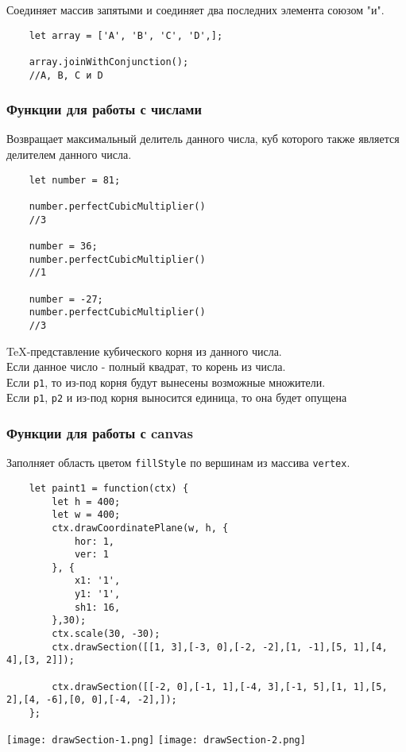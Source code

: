 Соединяет массив запятыми и соединяет два последних элемента союзом "и".

\begin{lstlisting}
    let array = ['A', 'B', 'C', 'D',];

    array.joinWithConjunction();
    //A, B, C и D
\end{lstlisting}

\subsubsection{Функции для работы с числами}
Возвращает максимальный делитель данного числа, куб которого также является делителем данного числа.

\begin{lstlisting}
    let number = 81;

    number.perfectCubicMultiplier()
    //3

    number = 36;
    number.perfectCubicMultiplier()
    //1

    number = -27;
    number.perfectCubicMultiplier()
    //3
\end{lstlisting}

TeX-представление кубического корня из данного числа.\\
Если данное число - полный квадрат, то корень из числа.\\
Если \texttt{p1}, то из-под корня будут вынесены возможные множители.\\
Если \texttt{p1}, \texttt{p2} и из-под корня выносится единица, то она будет опущена\\

\subsubsection{Функции для работы с canvas}
Заполняет область цветом \texttt{fillStyle} по вершинам из массива \texttt{vertex}.

\begin{lstlisting}
    let paint1 = function(ctx) {
        let h = 400;
        let w = 400;
        ctx.drawCoordinatePlane(w, h, {
            hor: 1,
            ver: 1
        }, {
            x1: '1',
            y1: '1',
            sh1: 16,
        },30);
        ctx.scale(30, -30);
        ctx.drawSection([[1, 3],[-3, 0],[-2, -2],[1, -1],[5, 1],[4, 4],[3, 2]]);

        ctx.drawSection([[-2, 0],[-1, 1],[-4, 3],[-1, 5],[1, 1],[5, 2],[4, -6],[0, 0],[-4, -2],]);
    };
    \end{lstlisting}
    \texttt{[image: drawSection-1.png]}
    \texttt{[image: drawSection-2.png]}

